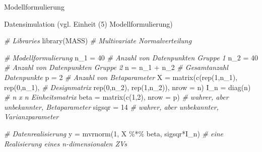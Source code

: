 \documentclass[
  8pt,
  ignorenonframetext,
]{beamer}
\newenvironment{Shaded}{\begin{snugshade}}{\end{snugshade}}
\newcommand{\AttributeTok}[1]{\textcolor[rgb]{0.77,0.63,0.00}{#1}}
\newcommand{\CommentTok}[1]{\textcolor[rgb]{0.56,0.35,0.01}{\textit{#1}}}
\newcommand{\DecValTok}[1]{\textcolor[rgb]{0.00,0.00,0.81}{#1}}
\newcommand{\FunctionTok}[1]{\textcolor[rgb]{0.00,0.00,0.00}{#1}}
\newcommand{\NormalTok}[1]{#1}
\newcommand{\OtherTok}[1]{\textcolor[rgb]{0.56,0.35,0.01}{#1}}
\newcommand{\SpecialCharTok}[1]{\textcolor[rgb]{0.00,0.00,0.00}{#1}}
\begin{document}
\begin{frame}[fragile]{Modellformulierung}
\protect\hypertarget{modellformulierung-3}{}
\small

Datensimulation (vgl. Einheit (5) Modellformulierung) \vspace{4mm}

\footnotesize
{}

\begin{Shaded}
\begin{Highlighting}[]
\CommentTok{\# Libraries}
\FunctionTok{library}\NormalTok{(MASS)                                }\CommentTok{\# Multivariate Normalverteilung}

\CommentTok{\# Modellformulierung}
\NormalTok{n\_1    }\OtherTok{=} \DecValTok{40}                                  \CommentTok{\# Anzahl von Datenpunkten Gruppe 1}
\NormalTok{n\_2    }\OtherTok{=} \DecValTok{40}                                  \CommentTok{\# Anzahl von Datenpunkten Gruppe 2}
\NormalTok{n      }\OtherTok{=}\NormalTok{ n\_1 }\SpecialCharTok{+}\NormalTok{ n\_2                           }\CommentTok{\# Gesamtanzahl Datenpunkte}
\NormalTok{p      }\OtherTok{=} \DecValTok{2}                                   \CommentTok{\# Anzahl von Betaparameter}
\NormalTok{X      }\OtherTok{=} \FunctionTok{matrix}\NormalTok{(}\FunctionTok{c}\NormalTok{(}\FunctionTok{rep}\NormalTok{(}\DecValTok{1}\NormalTok{,n\_1), }\FunctionTok{rep}\NormalTok{(}\DecValTok{0}\NormalTok{,n\_1),    }\CommentTok{\# Designmatrix}
                  \FunctionTok{rep}\NormalTok{(}\DecValTok{0}\NormalTok{,n\_2), }\FunctionTok{rep}\NormalTok{(}\DecValTok{1}\NormalTok{,n\_2)),}
                  \AttributeTok{nrow  =}\NormalTok{ n)}
\NormalTok{I\_n    }\OtherTok{=} \FunctionTok{diag}\NormalTok{(n)                             }\CommentTok{\# n x n Einheitsmatrix}
\NormalTok{beta   }\OtherTok{=} \FunctionTok{matrix}\NormalTok{(}\FunctionTok{c}\NormalTok{(}\DecValTok{1}\NormalTok{,}\DecValTok{2}\NormalTok{), }\AttributeTok{nrow =}\NormalTok{ p)            }\CommentTok{\# wahrer, aber unbekannter, Betaparameter}
\NormalTok{sigsqr }\OtherTok{=} \DecValTok{14}                                  \CommentTok{\# wahrer, aber unbekannter, Varianzparameter}

\CommentTok{\# Datenrealisierung}
\NormalTok{y      }\OtherTok{=} \FunctionTok{mvrnorm}\NormalTok{(}\DecValTok{1}\NormalTok{, X }\SpecialCharTok{\%*\%}\NormalTok{ beta, sigsqr}\SpecialCharTok{*}\NormalTok{I\_n)  }\CommentTok{\# eine Realisierung eines n{-}dimensionalen ZVs}
\end{Highlighting}
\end{Shaded}
\end{frame}
\end{document}
